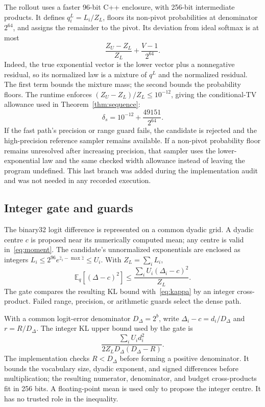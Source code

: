\documentclass[10pt]{article}
\theoremstyle{definition}\newtheorem{definition}[theorem]{Definition}
\newcommand{\E}{\mathbb E}
\begin{document}
The rollout uses a faster 96-bit C++ enclosure, with 256-bit intermediate products. It defines $q_i^L=L_i/Z_L$, floors its non-pivot probabilities at denominator $2^{64}$, and assigns the remainder to the pivot. Its deviation from ideal softmax is at most
\begin{equation}\label{eq:sampler}
 \frac{Z_U-Z_L}{Z_L}+\frac{V-1}{2^{64}}.
\end{equation}
Indeed, the true exponential vector is the lower vector plus a nonnegative residual, so its normalized law is a mixture of $q^L$ and the normalized residual. The first term bounds the mixture mass; the second bounds the probability floors. The runtime enforces $(Z_U-Z_L)/Z_L\leq10^{-12}$, giving the conditional-TV allowance used in Theorem~\ref{thm:sequence}:
\[
 \delta_s=10^{-12}+\frac{49151}{2^{64}}.
\]
 If the fast path's precision or range guard fails, the candidate is rejected and the high-precision reference sampler remains available. If a non-pivot probability floor remains unresolved after increasing precision, that sampler uses the lower-exponential law and the same checked width allowance instead of leaving the program undefined. This last branch was added during the implementation audit and was not needed in any recorded execution.

\subsection{Integer gate and guards}
\label{app:gate-arithmetic}
The binary32 logit difference is represented on a common dyadic grid. A dyadic centre $c$ is proposed near its numerically computed mean; any centre is valid in~\eqref{eq:moment}. The candidate's unnormalized exponentials are enclosed as integers $L_i\leq 2^{96}e^{\hat z_i-\max\hat z}\leq U_i$. With $Z_L=\sum_iL_i$,
\[
 \E_q[(\Delta-c)^2]
 \leq \frac{\sum_i U_i(\Delta_i-c)^2}{Z_L}.
\]
The gate compares the resulting KL bound with~\eqref{eq:kappa} by an integer cross-product. Failed range, precision, or arithmetic guards select the dense path.

With a common logit-error denominator $D_\Delta=2^b$, write $\Delta_i-c=d_i/D_\Delta$ and $r=R/D_\Delta$. The integer KL upper bound used by the gate is
\[
 \frac{\sum_i U_i d_i^2}{2Z_LD_\Delta(D_\Delta-R)}.
\]
The implementation checks $R<D_\Delta$ before forming a positive denominator. It bounds the vocabulary size, dyadic exponent, and signed differences before multiplication; the resulting numerator, denominator, and budget cross-products fit in 256 bits. A floating-point mean is used only to propose the integer centre. It has no trusted role in the inequality.
\end{document}
